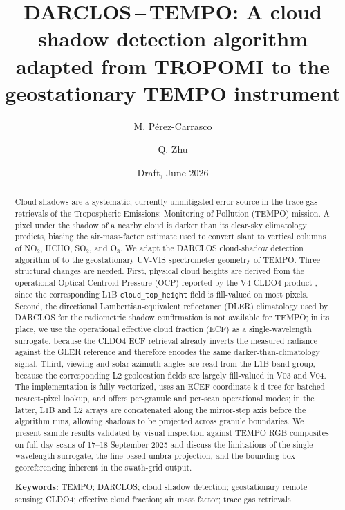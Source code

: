 \documentclass[11pt,a4paper]{article}
\title{\bfseries DARCLOS\,--\,TEMPO: A cloud shadow detection algorithm adapted
from TROPOMI to the geostationary TEMPO instrument}
\author[1]{M. Pérez-Carrasco}
\author[1]{Q. Zhu}
\affil[1]{[Affiliation TBD]}
\date{Draft, June 2026}
\newcommand{\code}[1]{\texttt{#1}}
\begin{document}

\maketitle

\begin{abstract}
\noindent
Cloud shadows are a systematic, currently unmitigated error source in the
trace-gas retrievals of the Tropospheric Emissions: Monitoring of Pollution
(TEMPO) mission. A pixel under the shadow of a nearby cloud is darker than
its clear-sky climatology predicts, biasing the air-mass-factor estimate
used to convert slant to vertical columns of NO$_2$, HCHO, SO$_2$, and O$_3$.
We adapt the DARCLOS cloud-shadow detection algorithm of
\citet{trees2022darclos} to the geostationary UV-VIS spectrometer geometry
of TEMPO. Three structural changes are needed. First, physical cloud heights
are derived from the operational Optical Centroid Pressure (OCP) reported
by the V4 CLDO4 product \citep{wang2025cldo4}, since the corresponding L1B
\code{cloud\_top\_height} field is fill-valued on most pixels. Second, the
directional Lambertian-equivalent reflectance (DLER) climatology used by
DARCLOS for the radiometric shadow confirmation is not available for TEMPO;
in its place, we use the operational effective cloud fraction (ECF) as a
single-wavelength surrogate, because the CLDO4 ECF retrieval already
inverts the measured radiance against the GLER reference and therefore
encodes the same darker-than-climatology signal. Third, viewing and solar
azimuth angles are read from the L1B band group, because the corresponding
L2 geolocation fields are largely fill-valued in V03 and V04. The
implementation is fully vectorized, uses an ECEF-coordinate k-d tree for
batched nearest-pixel lookup, and offers per-granule and per-scan
operational modes; in the latter, L1B and L2 arrays are concatenated along
the mirror-step axis before the algorithm runs, allowing shadows to be
projected across granule boundaries. We present sample results validated
by visual inspection against TEMPO RGB composites on full-day scans of
17--18 September 2025 and discuss the limitations of the single-wavelength
surrogate, the line-based umbra projection, and the bounding-box
georeferencing inherent in the swath-grid output.

\medskip
\noindent\textbf{Keywords:} TEMPO; DARCLOS; cloud shadow detection;
geostationary remote sensing; CLDO4; effective cloud fraction;
air mass factor; trace gas retrievals.
\end{abstract}
\end{document}
